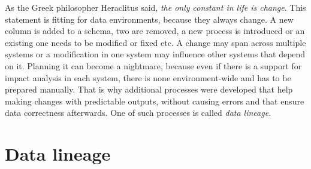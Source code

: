 \par
As the Greek philosopher Heraclitus said, \textit{the only constant in life is change}. This statement is fitting for data environments, because they always change. A new column is added to a schema, two are removed, a new process is introduced or an existing one needs to be modified or fixed etc. A change may span across multiple systems or a modification in one system may influence other systems that depend on it. Planning it can become a nightmare, because even if there is a support for impact analysis in each system, there is none environment-wide and has to be prepared manually. That is why additional processes were developed that help making changes with predictable outputs, without causing errors and that ensure data correctness afterwards. One of such processes is called \textit{data lineage}. 

\section{Data lineage}

